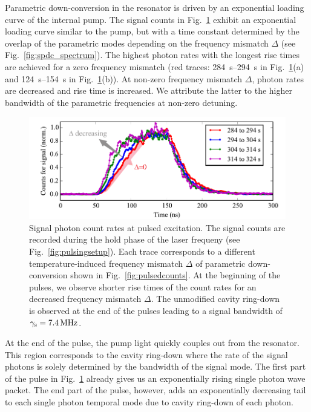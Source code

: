 \documentclass[aps,pra,showpacs,reprint,onecolumn,notitlepage]{revtex4-1}
\newcommand{\tx}[1]{\textnormal{#1}}
\begin{document}
Parametric down-conversion in the resonator is driven by an exponential loading curve of the internal pump. The signal counts in Fig.~\ref{fig:pulsedcountsnano} exhibit an exponential loading curve similar to the pump, but with a time constant determined by the overlap of the parametric modes depending on the frequency mismatch $\Delta$ (see Fig.~\ref{fig:spdc_spectrum}). The highest photon rates with the longest rise times are achieved for a zero frequency mismatch (red traces: \SIrange[range-units = single]{284}{294}{\s} in Fig.~\ref{fig:pulsedcountsnano}(a) and \SIrange[range-units = single]{124}{154}{\s} in Fig.~\ref{fig:pulsedcountsnano}(b)). At non-zero frequency mismatch $\Delta$, photon rates are decreased and rise time is increased. We attribute the latter to the higher bandwidth of the parametric frequencies at non-zero detuning.
\begin{figure}[htb]
	\centering
	\includegraphics[scale=0.8]{pictures/exp_WGMR_detuning/SPDC_detuning_pulses_1.pdf} 
	\caption{Signal photon count rates at pulsed excitation. The signal counts are recorded during the hold phase of the laser frequeny (see Fig.~\ref{fig:pulsingsetup}). Each trace corresponds to a different temperature-induced frequency mismatch $\Delta$ of parametric down-conversion shown in Fig.~\ref{fig:pulsedcounts}. At the beginning of the pulses, we observe shorter rise times of the count rates for an decreased frequency mismatch $\Delta$. The unmodified cavity ring-down is observed at the end of the pulses leading to a signal bandwidth of ${\gamma_\tx{s}=\SI{7.4}{\MHz}}$.}
	\label{fig:pulsedcountsnano}
\end{figure}

At the end of the pulse, the pump light quickly couples out from the resonator. This region corresponds to the cavity ring-down where the rate of the signal photons is solely determined by the bandwidth of the signal mode. The first part of the pulse in Fig.~\ref{fig:pulsedcountsnano} already gives us an exponentially rising single photon wave packet. The end part of the pulse, however, adds an exponentially decreasing tail to each single photon temporal mode due to cavity ring-down of each photon.
\end{document}
